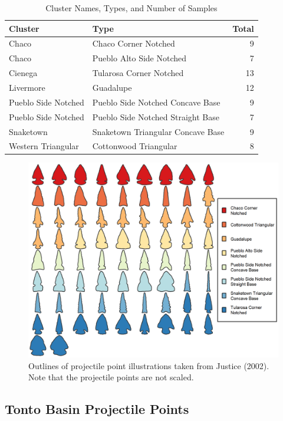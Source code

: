 \documentclass[letterpaper]{article}
\begin{document}
\begin{table}

\caption{\label{tab:tblJusticeTypes}Cluster Names, Types, and Number of Samples}
\centering
\begin{tabular}[t]{llr}
\toprule
Cluster & Type & Total\\
\midrule
Chaco & Chaco Corner Notched & 9\\
Chaco & Pueblo Alto Side Notched & 7\\
Cienega & Tularosa Corner Notched & 13\\
Livermore & Guadalupe & 12\\
Pueblo Side Notched & Pueblo Side Notched Concave Base & 9\\
\addlinespace
Pueblo Side Notched & Pueblo Side Notched Straight Base & 7\\
Snaketown & Snaketown Triangular Concave Base & 9\\
Western Triangular & Cottonwood Triangular & 8\\
\bottomrule
\end{tabular}
\end{table}

\begin{figure}
\includegraphics[width=1\linewidth]{figures/JusticePointsTypesFinal} \caption{Outlines of projectile point illustrations taken from Justice (2002). Note that the projectile points are not scaled.}\label{fig:JusticePointsTypesFinal}
\end{figure}

\hypertarget{tonto-basin-projectile-points}{%
\subsection*{Tonto Basin Projectile Points}\label{tonto-basin-projectile-points}}
\end{document}
